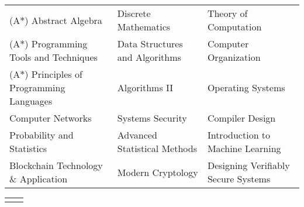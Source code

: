 
{\fontsize{9.5pt}{1.5em}\bodyfontlight\upshape\color{text}
  \setlength\extrarowheight{-3pt}
  \begin{tabular*}{\textwidth}{L{\textwidth/3} L{\textwidth/3} L{\textwidth/3}}
    (A$*$) Abstract Algebra & Discrete Mathematics & Theory of Computation \\
    (A$*$) Programming Tools and Techniques & Data Structures and Algorithms & Computer Organization \\
    (A$*$) Principles of Programming Languages & Algorithms II & Operating Systems \\
    Computer Networks & Systems Security & Compiler Design \\
    Probability and Statistics & Advanced Statistical Methods & Introduction to Machine Learning \\
    Blockchain Technology \& Application & Modern Cryptology & Designing Verifiably Secure Systems \\ %

\end{tabular*}

\fontsize{9.5pt}{1em}\footerfont\upshape\color{text}
\begin{tabular*}{\textwidth}{L{\textwidth/3 + 1cm} L{\textwidth/3}}
\end{tabular*}
\vspace{-1.2em}
}

